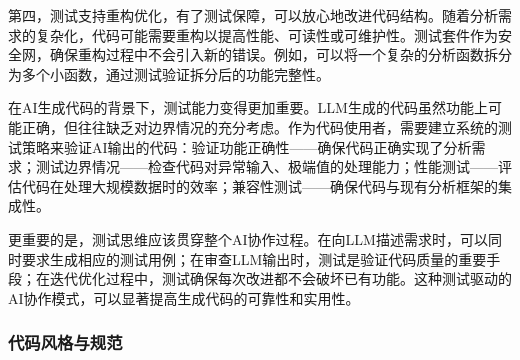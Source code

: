\documentclass[
]{book}
\begin{document}
第四，测试支持重构优化，有了测试保障，可以放心地改进代码结构。随着分析需求的复杂化，代码可能需要重构以提高性能、可读性或可维护性。测试套件作为安全网，确保重构过程中不会引入新的错误。例如，可以将一个复杂的分析函数拆分为多个小函数，通过测试验证拆分后的功能完整性。

在AI生成代码的背景下，测试能力变得更加重要。LLM生成的代码虽然功能上可能正确，但往往缺乏对边界情况的充分考虑。作为代码使用者，需要建立系统的测试策略来验证AI输出的代码：验证功能正确性------确保代码正确实现了分析需求；测试边界情况------检查代码对异常输入、极端值的处理能力；性能测试------评估代码在处理大规模数据时的效率；兼容性测试------确保代码与现有分析框架的集成性。

更重要的是，测试思维应该贯穿整个AI协作过程。在向LLM描述需求时，可以同时要求生成相应的测试用例；在审查LLM输出时，测试是验证代码质量的重要手段；在迭代优化过程中，测试确保每次改进都不会破坏已有功能。这种测试驱动的AI协作模式，可以显著提高生成代码的可靠性和实用性。

\hypertarget{ux4ee3ux7801ux98ceux683cux4e0eux89c4ux8303}{%
\subsubsection{代码风格与规范}\label{ux4ee3ux7801ux98ceux683cux4e0eux89c4ux8303}}
\end{document}
